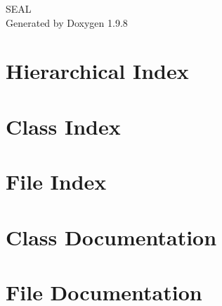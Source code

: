 \documentclass[twoside]{book}
\newcommand{\+}{\discretionary{\mbox{\scriptsize$\hookleftarrow$}}{}{}}
\newcommand{\clearemptydoublepage}{%
    \newpage{\pagestyle{empty}\cleardoublepage}%
  }
\begin{document}
  \raggedbottom
    \hypersetup{pageanchor=false,
                bookmarksnumbered=true,
                pdfencoding=unicode
               }
  \begin{titlepage}
  \vspace*{7cm}
  \begin{center}%
  {\Large SEAL}\\
  \vspace*{1cm}
  {\large Generated by Doxygen 1.9.8}\\
  \end{center}
  \end{titlepage}
  \clearemptydoublepage
  \tableofcontents
  \clearemptydoublepage
  \hypersetup{pageanchor=true}
\chapter{Hierarchical Index}

\chapter{Class Index}

\chapter{File Index}

\chapter{Class Documentation}









\chapter{File Documentation}


















  \backmatter
  \newpage
  \clearemptydoublepage
  \printindex
\end{document}
